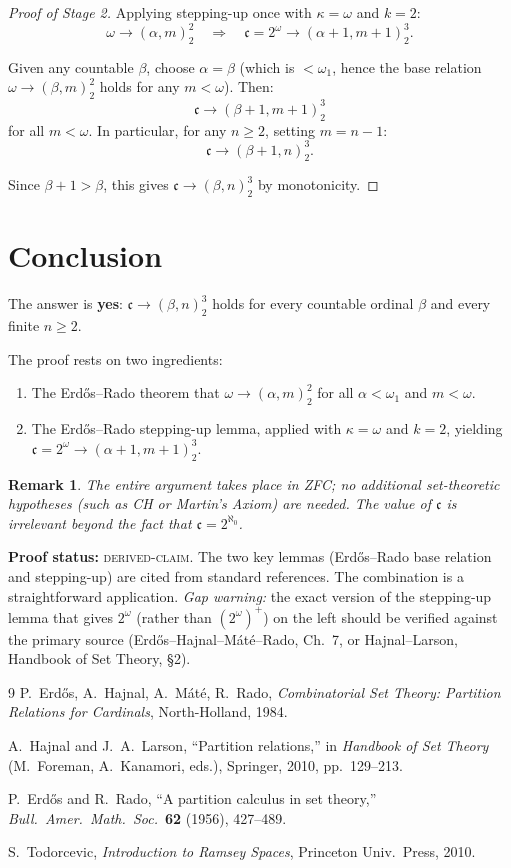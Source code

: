 \documentclass[12pt]{article}
\newtheorem{remark}[theorem]{Remark}
\newcommand{\fc}{\mathfrak{c}}
\begin{document}
\begin{proof}[Proof of Stage 2]
Applying stepping-up once with $\kappa=\omega$ and $k=2$:
\[
  \omega\to(\alpha,m)^2_2
  \quad\Longrightarrow\quad
  \fc=2^\omega \to (\alpha+1, m+1)^3_2.
\]

Given any countable $\beta$, choose $\alpha = \beta$ (which is $<\omega_1$,
hence the base relation $\omega\to(\beta,m)^2_2$ holds for any $m<\omega$).
Then:
\[
  \fc\to(\beta+1, m+1)^3_2
\]
for all $m<\omega$.  In particular, for any $n\ge 2$, setting $m=n-1$:
\[
  \fc\to(\beta+1, n)^3_2.
\]

Since $\beta+1>\beta$, this gives $\fc\to(\beta,n)^3_2$ by monotonicity.
\end{proof}

\section*{Conclusion}

The answer is \textbf{yes}: $\fc\to(\beta,n)^3_2$ holds for every
countable ordinal $\beta$ and every finite $n\ge 2$.

The proof rests on two ingredients:
\begin{enumerate}
\item The Erd\H{o}s--Rado theorem that $\omega\to(\alpha,m)^2_2$ for all
      $\alpha<\omega_1$ and $m<\omega$.
\item The Erd\H{o}s--Rado stepping-up lemma, applied with $\kappa=\omega$
      and $k=2$, yielding $\fc=2^\omega\to(\alpha+1,m+1)^3_2$.
\end{enumerate}

\begin{remark}
The entire argument takes place in ZFC; no additional set-theoretic
hypotheses (such as CH or Martin's Axiom) are needed.  The value of
$\fc$ is irrelevant beyond the fact that $\fc=2^{\aleph_0}$.
\end{remark}

\bigskip
\noindent\textbf{Proof status:} \textsc{derived-claim}.  The two key
lemmas (Erd\H{o}s--Rado base relation and stepping-up) are cited from
standard references.  The combination is a straightforward application.
\emph{Gap warning:} the exact version of the stepping-up lemma that gives
$2^\omega$ (rather than $(2^\omega)^+$) on the left should be verified
against the primary source (Erd\H{o}s--Hajnal--M\'at\'e--Rado, Ch.~7,
or Hajnal--Larson, Handbook of Set Theory, \S2).

\begin{thebibliography}{9}
P.~Erd\H{o}s, A.~Hajnal, A.~M\'at\'e, R.~Rado,
\emph{Combinatorial Set Theory: Partition Relations for Cardinals},
North-Holland, 1984.

A.~Hajnal and J.~A.~Larson, ``Partition relations,''
in \emph{Handbook of Set Theory} (M.~Foreman, A.~Kanamori, eds.),
Springer, 2010, pp.~129--213.

P.~Erd\H{o}s and R.~Rado, ``A partition calculus in set theory,''
\emph{Bull.\ Amer.\ Math.\ Soc.}\ \textbf{62} (1956), 427--489.

S.~Todorcevic, \emph{Introduction to Ramsey Spaces},
Princeton Univ.\ Press, 2010.
\end{thebibliography}
\end{document}
